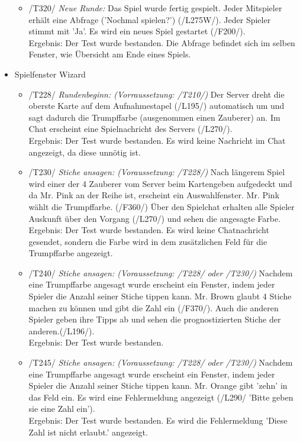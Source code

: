 \documentclass[a4paper]{article}
\begin{document}
\begin{itemize}
\begin{itemize}
		\item /T320/ \textit{Neue Runde:} Das Spiel wurde fertig gespielt. Jeder Mitspieler erhält eine Abfrage ('Nochmal 				spielen?') (/L275W/). Jeder Spieler stimmt mit 'Ja'. Es wird ein neues Spiel gestartet (/F200/). \\
		Ergebnis: Der Test wurde bestanden. Die Abfrage befindet sich im selben Fenster, wie Übersicht am Ende eines 				Spiels.
		
		
	\end{itemize}\item Spielfenster Wizard
	\begin{itemize}
		\item /T228/ \textit{Rundenbeginn: (Vorraussetzung: /T210/)} Der Server dreht die oberste Karte auf dem 				Aufnahmestapel (/L195/) automatisch um und sagt dadurch die Trumpffarbe (ausgenommen einen Zauberer) an. Im 			Chat erscheint eine Spielnachricht des Servers (/L270/). \\
		Ergebnis: Der Test wurde bestanden. Es wird keine Nachricht im Chat angezeigt, da diese unnötig ist.

		\item /T230/ \textit{Stiche ansagen: (Voraussetzung: /T228/)} Nach längerem Spiel wird einer der 4 Zauberer vom 			Server beim Kartengeben aufgedeckt und da Mr. Pink an der Reihe ist, erscheint ein Auswahlfenster. Mr. Pink 			wählt die Trumpffarbe. (/F360/) Über den Spielchat erhalten alle Spieler Auskunft über den Vorgang (/L270/) und 				sehen die angesagte Farbe. \\
		Ergebnis: Der Test wurde bestanden. Es wird keine Chatnachricht gesendet, sondern die Farbe wird in dem 				zusätzlichen Feld für die Trumpffarbe angezeigt.
	
		\item /T240/ \textit{Stiche ansagen: (Voraussetzung: /T228/ oder /T230/)} Nachdem eine Trumpffarbe angesagt 				wurde erscheint ein Fenster, indem jeder Spieler die Anzahl seiner Stiche tippen kann. Mr. Brown glaubt 4 Stiche 				machen zu können und gibt die Zahl ein (/F370/). Auch die anderen Spieler geben ihre Tipps ab und sehen die 				prognostizierten Stiche der anderen.(/L196/). \\
		Ergebnis: Der Test wurde bestanden.
		
		\item /T245/ \textit{Stiche ansagen: (Voraussetzung: /T228/ oder /T230/)} Nachdem eine Trumpffarbe angesagt 				wurde erscheint ein Fenster, indem jeder Spieler die Anzahl seiner Stiche tippen kann. Mr. Orange gibt 'zehn' in das 			Feld ein. Es wird eine Fehlermeldung angezeigt (/L290/ 'Bitte geben sie eine Zahl ein'). \\
		Ergebnis: Der Test wurde bestanden. Es wird die Fehlermeldung 'Diese Zahl ist nicht erlaubt.' angezeigt.
		

\end{itemize}
\end{itemize}
\end{document}
